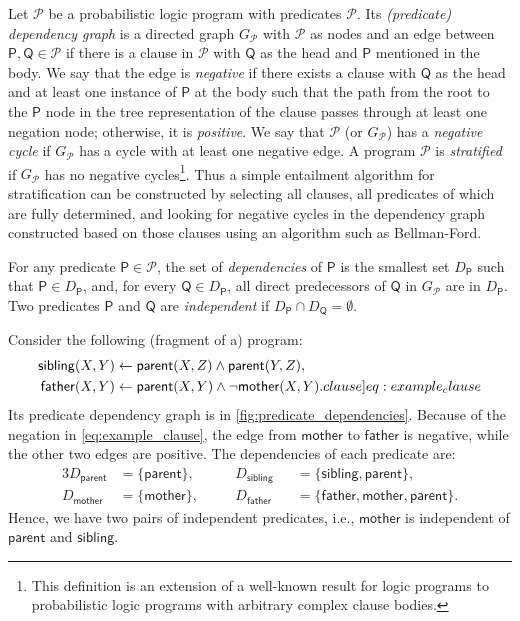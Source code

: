 \documentclass[runningheads]{llncs}
\newcommand{\predicates}{\mathcal{P}}
\begin{document}
Let $\mathscr{P}$ be a probabilistic logic program with predicates
$\predicates{}$. Its \emph{(predicate) dependency graph} is a directed graph
$G_{\mathscr{P}}$ with $\predicates{}$ as nodes and an edge between $\mathsf{P},
\mathsf{Q} \in \predicates{}$ if there is a clause in $\mathscr{P}$ with
$\mathsf{Q}$ as the head and $\mathsf{P}$ mentioned in the body. We say that the
edge is \emph{negative} if there exists a clause with $\mathsf{Q}$ as the head
and at least one instance of $\mathsf{P}$ at the body such that the path from
the root to the $\mathsf{P}$ node in the tree representation of the clause
passes through at least one negation node; otherwise, it is \emph{positive}. We
say that $\mathscr{P}$ (or $G_{\mathscr{P}}$) has a \emph{negative cycle} if
$G_{\mathscr{P}}$ has a cycle with at least one negative edge. A program
$\mathscr{P}$ is \emph{stratified} if $G_{\mathscr{P}}$ has no negative
cycles\footnote{This definition is an extension of a well-known result for logic
programs \cite{DBLP:journals/jlp/BalbinPRM91} to probabilistic logic programs
with arbitrary complex clause bodies.}. Thus a simple entailment algorithm for
stratification can be constructed by selecting all clauses, all predicates of
which are fully determined, and looking for negative cycles in the dependency
graph constructed based on those clauses using an algorithm such as
Bellman-Ford.

For any predicate $\mathsf{P} \in \predicates{}$, the set of \emph{dependencies}
of $\mathsf{P}$ is the smallest set $D_{\mathsf{P}}$ such that $\mathsf{P} \in
D_{\mathsf{P}}$, and, for every $\mathsf{Q} \in D_{\mathsf{P}}$, all direct
predecessors of $\mathsf{Q}$ in $G_{\mathscr{P}}$ are in $D_{\mathsf{P}}$. Two
predicates $\mathsf{P}$ and $\mathsf{Q}$ are \emph{independent} if
$D_{\mathsf{P}} \cap D_{\mathsf{Q}} = \emptyset$.

\begin{example} \label{ex:program}
  Consider the following (fragment of a) program:
  \begin{align}
    \mathsf{sibling}(X, Y) &\gets \mathsf{parent}(X, Z) \land \mathsf{parent}(Y, Z), \nonumber \\
    \mathsf{father}(X, Y) &\gets \mathsf{parent}(X, Y) \land \neg\mathsf{mother}(X, Y). \label[clause]{eq:example_clause}
  \end{align}
  Its predicate dependency graph is in \cref{fig:predicate_dependencies}.
  Because of the negation in \eqref{eq:example_clause}, the edge from
  $\mathsf{mother}$ to $\mathsf{father}$ is negative, while the other two edges
  are positive. The dependencies of each predicate are:
  \begin{alignat*}{3}
    D_{\mathsf{parent}} &= \{ \mathsf{parent} \}, \quad && D_{\mathsf{sibling}}
    &&= \{\mathsf{sibling}, \mathsf{parent} \},\\
    D_{\mathsf{mother}} &= \{ \mathsf{mother} \}, \quad && D_{\mathsf{father}}
    &&= \{ \mathsf{father}, \mathsf{mother}, \mathsf{parent} \}.
  \end{alignat*}
  Hence, we have two pairs of independent predicates, i.e., $\mathsf{mother}$ is
  independent of $\mathsf{parent}$ and $\mathsf{sibling}$.
\end{example}
\end{document}
